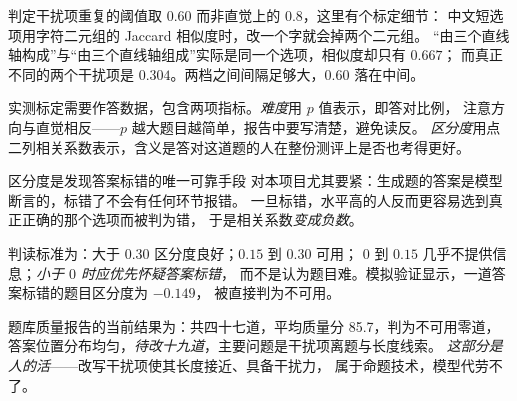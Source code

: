 判定干扰项重复的阈值取 $0.60$ 而非直觉上的 $0.8$，这里有个标定细节：
中文短选项用字符二元组的 Jaccard 相似度时，改一个字就会掉两个二元组。
“由三个直线轴构成”与“由三个直线轴组成”实际是同一个选项，相似度却只有 $0.667$；
而真正不同的两个干扰项是 $0.304$。两档之间间隔足够大，$0.60$ 落在中间。

实测标定需要作答数据，包含两项指标。\emph{难度}用 $p$ 值表示，即答对比例，
注意方向与直觉相反——$p$ 越大题目越简单，报告中要写清楚，避免读反。
\emph{区分度}用点二列相关系数表示，含义是答对这道题的人在整份测评上是否也考得更好。

\begin{keynote}{区分度是发现答案标错的唯一可靠手段}
对本项目尤其要紧：生成题的答案是模型断言的，标错了不会有任何环节报错。
一旦标错，水平高的人反而更容易选到真正正确的那个选项而被判为错，
于是相关系数\emph{变成负数}。

判读标准为：大于 $0.30$ 区分度良好；$0.15$ 到 $0.30$ 可用；
$0$ 到 $0.15$ 几乎不提供信息；\emph{小于 $0$ 时应优先怀疑答案标错}，
而不是认为题目难。模拟验证显示，一道答案标错的题目区分度为 $-0.149$，
被直接判为不可用。
\end{keynote}

题库质量报告的当前结果为：共四十七道，平均质量分 85.7，判为不可用零道，
答案位置分布均匀，\emph{待改十九道}，主要问题是干扰项离题与长度线索。
\emph{这部分是人的活}——改写干扰项使其长度接近、具备干扰力，
属于命题技术，模型代劳不了。




